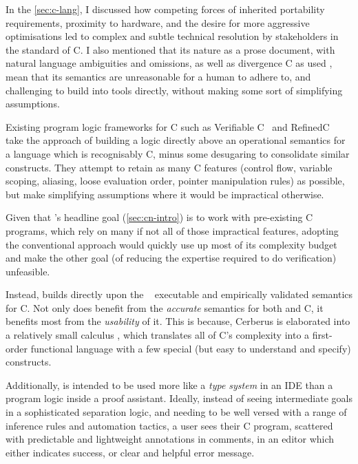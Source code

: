 In the \cref{sec:c-lang}, I discussed how competing forces of inherited
portability requirements, proximity to hardware, and the desire for more
aggressive optimisations led to complex and subtle technical resolution by
stakeholders in the  standard of C. I also mentioned that its nature as
a prose document, with natural language ambiguities and omissions, as well as
divergence C as used , mean that its semantics are unreasonable
for a human to adhere to, and challenging to build into tools directly,
without making some sort of simplifying assumptions.

Existing program logic frameworks for C such as Verifiable C~
and RefinedC~ take the approach of building a
logic directly above an operational semantics for a language which is
recognisably C, minus some desugaring to consolidate similar constructs. They
attempt to retain as many C features (control flow, variable scoping, aliasing,
loose evaluation order, pointer manipulation rules) as possible, but make
simplifying assumptions where it would be impractical otherwise.

Given that 's headline goal (\cref{sec:cn-intro}) is to work with
pre-existing C programs, which rely on many if not all of those impractical
features, adopting the conventional approach would quickly use up most of its
complexity budget and make the other goal (of reducing the expertise required
to do verification) unfeasible.

Instead,  builds directly upon the
~ executable and empirically
validated semantics for C. Not only does  benefit from the
\emph{accurate} semantics for both  and  C, it benefits
most from the \emph{usability} of it. This is because, Cerberus is elaborated
into a relatively small calculus \emph{}, which translates all of C's
complexity into a first-order functional language with a few special (but easy
to understand and specify) constructs.

Additionally,  is intended to be used more like a \emph{type system} in
an IDE than a program logic inside a proof assistant. Ideally, instead of
seeing intermediate goals in a sophisticated separation logic, and needing to
be well versed with a range of inference rules and automation tactics, a user
sees their C program, scattered with predictable and lightweight annotations in
comments, in an editor which either indicates success, or clear and helpful
error message.

